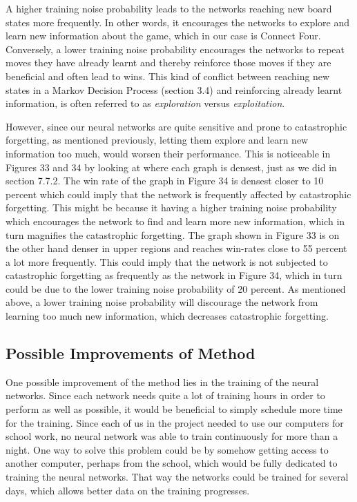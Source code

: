 \documentclass[titlepage]{article}
\begin{document}
\vskip 0.2cm

\noindent
A higher training noise probability leads to the networks reaching new board states more frequently. In other words, it encourages the networks to explore and learn new information about the game, which in our case is Connect Four. Conversely, a lower training noise probability encourages the networks to repeat moves they have already learnt and thereby reinforce those moves if they are beneficial and often lead to wins. This kind of conflict between reaching new states in a Markov Decision Process (section 3.4) and reinforcing already learnt information, is often referred to as \emph{exploration} versus \emph{exploitation}.

\vskip 0.2cm

\noindent
However, since our neural networks are quite sensitive and prone to catastrophic forgetting, as mentioned previously, letting them explore and learn new information too much, would worsen their performance. This is noticeable in Figures 33 and 34 by looking at where each graph is densest, just as we did in section 7.7.2. The win rate of the graph in Figure 34 is densest closer to 10 percent which could imply that the network is frequently affected by catastrophic forgetting. This might be because it having a higher training noise probability which encourages the network to find and learn more new information, which in turn magnifies the catastrophic forgetting. The graph shown in Figure 33 is on the other hand denser in upper regions and reaches win-rates close to 55 percent a lot more frequently. This could imply that the network is not subjected to catastrophic forgetting as frequently as the network in Figure 34, which in turn could be due to the lower training noise probability of 20 percent. As mentioned above, a lower training noise probability will discourage the network from learning too much new information, which decreases catastrophic forgetting.

\newpage

\subsection{Possible Improvements of Method}

\vskip 0.2cm

One possible improvement of the method lies in the training of the neural networks. Since each network needs quite a lot of training hours in order to perform as well as possible, it would be beneficial to simply schedule more time for the training. Since each of us in the project needed to use our computers for school work, no neural network was able to train continuously for more than a night. One way to solve this problem could be by somehow getting access to another computer, perhaps from the school, which would be fully dedicated to training the neural networks. That way the networks could be trained for several days, which allows better data on the training progresses.
\end{document}
